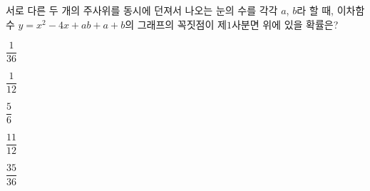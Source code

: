 서로 다른 두 개의 주사위를 동시에 던져서 나오는 눈의 수를 각각 $a$, $b$라 할 때, 이차함수 $y=x^2-4x+ab+a+b$의 그래프의 꼭짓점이 제$1$사분면 위에 있을 확률은?
\begin{choices32}{\rule[-3ex]{0pt}{8ex}$\dfrac{1}{36}$}{\rule[-3ex]{0pt}{8ex}$\dfrac{1}{12}$}{\rule[-3ex]{0pt}{8ex}$\dfrac{5}{6}$}{\rule[-3ex]{0pt}{8ex}$\dfrac{11}{12}$}{\rule[-3ex]{0pt}{8ex}$\dfrac{35}{36}$}\end{choices32}
